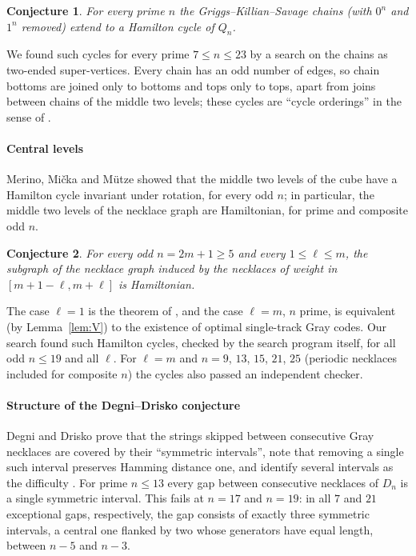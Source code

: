 \documentclass[journal,onecolumn,11pt]{IEEEtran}
\newtheorem{conjecture}{Conjecture}
\begin{document}
\begin{conjecture}\label{conj:D}
For every prime $n$ the Griggs--Killian--Savage chains (with $0^n$ and $1^n$ removed) extend to a Hamilton cycle of
$Q_n$.
\end{conjecture}

We found such cycles for every prime $7\le n\le 23$ by a search on the chains as two-ended super-vertices. Every chain
has an odd number of edges, so chain bottoms are joined only to bottoms and tops only to tops, apart from joins between
chains of the middle two levels; these cycles are ``cycle orderings'' in the sense of \cite{GMM}.

\paragraph{Central levels} Merino, Mi\v{c}ka and M\"utze \cite{MMM} showed that the middle two levels of the cube have a
Hamilton cycle invariant under rotation, for every odd $n$; in particular, the middle two levels of the necklace graph
are Hamiltonian, for prime and composite odd $n$.

\begin{conjecture}\label{conj:H}
For every odd $n=2m+1\ge5$ and every $1\le\ell\le m$, the subgraph of the necklace graph induced by the necklaces of
weight in $[m+1-\ell,m+\ell]$ is Hamiltonian.
\end{conjecture}

The case $\ell=1$ is the theorem of \cite{MMM}, and the case $\ell=m$, $n$ prime, is equivalent (by
Lemma~\ref{lem:V}) to the existence of optimal single-track Gray codes. Our search found such Hamilton cycles, checked by the search
program itself, for all odd $n\le19$ and all $\ell$. For $\ell=m$ and $n=9$, $13$, $15$, $21$, $25$ (periodic necklaces
included for composite $n$) the cycles also passed an independent checker.

\paragraph{Structure of the Degni--Drisko conjecture} Degni and Drisko prove that the strings skipped between
consecutive Gray necklaces are covered by their ``symmetric intervals'', note that removing a single such interval
preserves Hamming distance one, and identify several intervals as the difficulty \cite[Section 8]{DD07}. For prime
$n\le13$ every gap between consecutive necklaces of $D_n$ is a single symmetric interval. This fails at $n=17$ and
$n=19$: in all $7$ and $21$ exceptional gaps, respectively, the gap consists of exactly three symmetric intervals, a
central one flanked by two whose generators have equal length, between $n-5$ and $n-3$.
\end{document}
